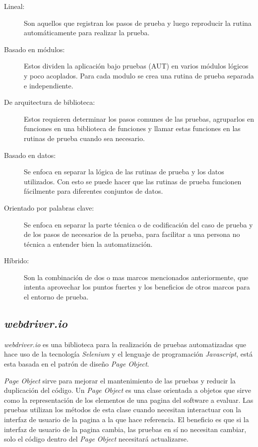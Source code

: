 \begin{description}
    \item [Lineal:] Son aquellos que registran los pasos de prueba y luego
        reproducir la rutina automáticamente para realizar la prueba.
    \item [Basado en módulos:] Estos dividen la aplicación bajo pruebas (AUT) en
        varios módulos lógicos y poco acoplados. Para cada modulo se crea una
        rutina de prueba separada e independiente.
    \item [De arquitectura de biblioteca:] Estos requieren determinar los pasos
        comunes de las pruebas, agruparlos en funciones en una biblioteca de
        funciones y llamar estas funciones en las rutinas de prueba cuando sea
        necesario.
    \item [Basado en datos:] Se enfoca en separar la lógica de las rutinas de
        prueba y los datos utilizados. Con esto se puede hacer que las rutinas
        de prueba funcionen fácilmente para diferentes conjuntos de datos.
    \item [Orientado por palabras clave:] Se enfoca en separar la parte técnica
        o de codificación del caso de prueba y de los pasos de necesarios de la
        prueba, para facilitar a una persona no técnica a entender bien la
        automatización.
    \item [Híbrido:] Son la combinación de dos o mas marcos mencionados
        anteriormente, que intenta aprovechar los puntos fuertes y los
        beneficios de otros marcos para el entorno de prueba.
\end{description}

\subsection{\emph{webdriver.io}}
\emph{webdriver.io} es una biblioteca para la realización de pruebas
automatizadas que hace uso de la tecnología \emph{Selenium} y el lenguaje de
programación \emph{Javascript}, está esta basada en el patrón de diseño
\emph{Page Object}.

\emph{Page Object} sirve para mejorar el mantenimiento de las pruebas y reducir
la duplicación del código. Un \emph{Page Object} es una clase orientada a
objetos que sirve como la representación de los elementos de una pagina del
software a evaluar. Las pruebas utilizan los métodos de esta clase cuando
necesitan interactuar con la interfaz de usuario de la pagina a la que hace
referencia. El beneficio es que si la interfaz de usuario de la pagina cambia,
las pruebas en sí no necesitan cambiar, solo el código dentro del
\emph{Page Object} necesitará actualizarse.

